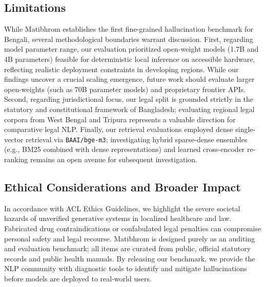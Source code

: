 \subsection{Limitations}
While Matibhrom establishes the first fine-grained hallucination benchmark for Bengali, several methodological boundaries warrant discussion. First, regarding model parameter range, our evaluation prioritized open-weight models (1.7B and 4B parameters) feasible for deterministic local inference on accessible hardware, reflecting realistic deployment constraints in developing regions. While our findings uncover a crucial scaling emergence, future work should evaluate larger open-weights (such as 70B parameter models) and proprietary frontier APIs. Second, regarding jurisdictional focus, our legal split is grounded strictly in the statutory and constitutional framework of Bangladesh; evaluating regional legal corpora from West Bengal and Tripura represents a valuable direction for comparative legal NLP. Finally, our retrieval evaluations employed dense single-vector retrieval via \texttt{BAAI/bge-m3}; investigating hybrid sparse-dense ensembles (e.g., BM25 combined with dense representations) and learned cross-encoder re-ranking remains an open avenue for subsequent investigation.

\subsection{Ethical Considerations and Broader Impact}
In accordance with ACL Ethics Guidelines, we highlight the severe societal hazards of unverified generative systems in localized healthcare and law. Fabricated drug contraindications or confabulated legal penalties can compromise personal safety and legal recourse. Matibhrom is designed purely as an auditing and evaluation benchmark; all items are curated from public, official statutory records and public health manuals. By releasing our benchmark, we provide the NLP community with diagnostic tools to identify and mitigate hallucinations before models are deployed to real-world users.
